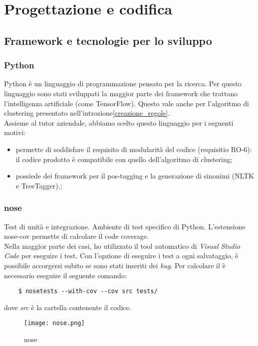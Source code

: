 
\chapter{Progettazione e codifica}
\label{cap:progettazione-codifica}

\section{Framework e tecnologie per lo sviluppo}
\label{sec:framework}
\subsection*{Python}
Python è un linguaggio di programmazione pensato per la ricerca. Per questo linguaggio sono stati sviluppati la maggior parte dei framework che trattano l'intelligenza artificiale (come TensorFlow). Questo vale anche per l'algoritmo di clustering presentato nell'introzione\ref{creazione_regole}.\\
Assieme al tutor aziendale, abbiamo scelto questo linguaggio per i seguenti motivi:
\begin{itemize}
    \item permette di soddisfare il requisito di modularità del codice (requisitio RO-6): il codice prodotto è compatibile con quello dell'algoritmo di clustering;
    \item possiede dei framework per il pos-tagging e la generazione di sinonimi (NLTK e TreeTagger).;
\end{itemize}

\subsection*{nose}
Test di unità e integrazione. Ambiente di test specifico di Python. L'estensione nose-cov permette di calcolare il code coverage.\\
Nella maggior parte dei casi, ho utilizzato il tool automatico di \textit{Visual Studio Code} per eseguire i test. Con l'opzione di eseguire i test a ogni salvataggio, è possibile accorgersi subito se sono stati inseriti dei \textit{bug}.
Per calcolare il  è necessario eseguire il seguente comando:
\begin{lstlisting}
    $ nosetests --with-cov --cov src tests/
\end{lstlisting}
dove \textit{src} è la cartella contenente il codice.
\begin{figure}[H]
    \centering
    \texttt{[image: nose.png]} 
    \caption{nose}
    \label{logo:company}
\end{figure}    
